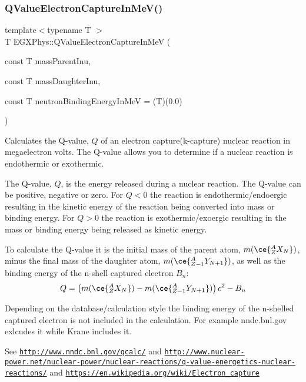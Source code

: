 \subsubsection{\texorpdfstring{Q\+Value\+Electron\+Capture\+In\+Me\+V()}{QValueElectronCaptureInMeV()}}
{\footnotesize\ttfamily template$<$typename T $>$ \\
T E\+G\+X\+Phys\+::\+Q\+Value\+Electron\+Capture\+In\+MeV (\begin{DoxyParamCaption}\item[{const T}]{mass\+Parent\+Inu,  }\item[{const T}]{mass\+Daughter\+Inu,  }\item[{const T}]{neutron\+Binding\+Energy\+In\+MeV = {\ttfamily (T)(0.0)} }\end{DoxyParamCaption})}



Calculates the Q-\/value, $Q$ of an electron capture(k-\/capture) nuclear reaction in megaelectron volts. The Q-\/value allows you to determine if a nuclear reaction is endothermic or exothermic. 

The Q-\/value, $Q$, is the energy released during a nuclear reaction. The Q-\/value can be positive, negative or zero. For $Q < 0$ the reaction is endothermic/endoergic resulting in the kinetic energy of the reaction being converted into mass or binding energy. For $Q > 0$ the reaction is exothermic/exoergic resulting in the mass or binding energy being released as kinetic energy.

To calculate the Q-\/value it is the initial mass of the parent atom, $m(\ce{ ^{A}_{Z}X_{N} })$, minus the final mass of the daughter atom, $m(\ce{ ^{A}_{Z -1}Y_{N +1} })$, as well as the binding energy of the n-\/shell captured electron $B_n$\+: \[Q = \left ( m(\ce{ ^{A}_{Z}X_{N} })-m(\ce{ ^{A}_{Z -1}Y_{N +1} }) \right) c^2-B_n\]

Depending on the database/calculation style the binding energy of the n-\/shelled captured electron is not included in the calculation. For example nndc.\+bnl.\+gov exlcudes it while Krane includes it.

See \href{http://www.nndc.bnl.gov/qcalc/}{\tt http\+://www.\+nndc.\+bnl.\+gov/qcalc/} and \href{http://www.nuclear-power.net/nuclear-power/nuclear-reactions/q-value-energetics-nuclear-reactions/}{\tt http\+://www.\+nuclear-\/power.\+net/nuclear-\/power/nuclear-\/reactions/q-\/value-\/energetics-\/nuclear-\/reactions/} and \href{https://en.wikipedia.org/wiki/Electron_capture}{\tt https\+://en.\+wikipedia.\+org/wiki/\+Electron\+\_\+capture}

